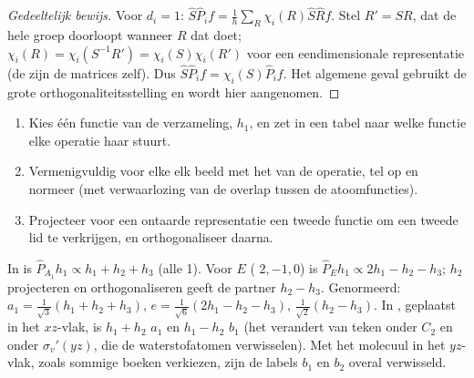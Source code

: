 \begin{proof}[Gedeeltelijk bewijs]
Voor $d_i = 1$: $\hat S\hat P_if = \frac1h\sum_R\chi_i(R)\hat S\hat Rf$. Stel $R' = SR$,
dat de hele groep doorloopt wanneer $R$ dat doet; $\chi_i(R) = \chi_i(S^{-1}R') =
\chi_i(S)\chi_i(R')$ voor een eendimensionale representatie (de 
zijn de matrices zelf). Dus $\hat S\hat P_if = \chi_i(S)\hat P_if$. Het
algemene geval gebruikt de grote orthogonaliteitsstelling en wordt hier
aangenomen.
\end{proof}

\begin{method}\label{met:b3:group-theory-applied:salc}
\begin{enumerate}
  \item Kies één functie van de verzameling, $h_1$, en zet in een tabel naar
        welke functie elke operatie haar stuurt.
  \item Vermenigvuldig voor elke  elk beeld met
        het  van de operatie, tel op en normeer (met verwaarlozing
        van de overlap tussen de atoomfuncties).
  \item Projecteer voor een ontaarde representatie een tweede functie om
        een tweede lid te verkrijgen, en orthogonaliseer daarna.
\end{enumerate}
\end{method}

\begin{example}\label{ex:b3:group-theory-applied:salcs}
In  is $\hat P_{A_1}h_1 \propto h_1 + h_2 + h_3$ (alle  1). Voor $E$
( $2, -1, 0$) is $\hat P_Eh_1 \propto 2h_1 - h_2 - h_3$; $h_2$
projecteren en
orthogonaliseren geeft de partner $h_2 - h_3$. Genormeerd: $a_1 =
\frac{1}{\sqrt3}(h_1 + h_2 + h_3)$, $e = \frac{1}{\sqrt6}(2h_1 - h_2 - h_3)$,
$\frac{1}{\sqrt2}(h_2 - h_3)$. In , geplaatst in het $xz$-vlak, is $h_1 + h_2$
$a_1$ en $h_1 - h_2$ $b_1$ (het verandert van teken onder $C_2$ en onder $\sigma_v'(yz)$,
die de waterstofatomen verwisselen). Met het molecuul in het $yz$-vlak,
zoals sommige boeken verkiezen, zijn de labels $b_1$ en $b_2$ overal
verwisseld.
\end{example}

